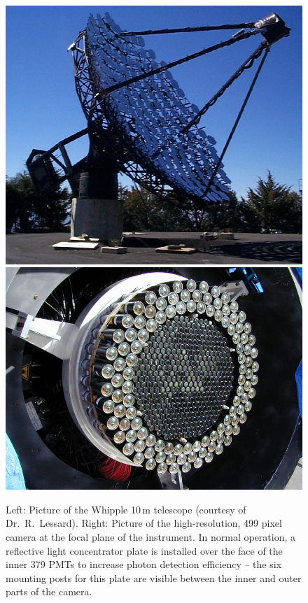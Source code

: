 \begin{figure}[p]
\hspace*{\fill}\includegraphics[height=0.25\textheight]{plots/chap-introduction/whipple99.jpg}\hspace*{\fill}\includegraphics[height=0.25\textheight]{plots/chap-introduction/G3Camera2_small.jpg}\hspace*{\fill}
\caption{\label{FIG::INTRODUCTION::PICS10M} Left: Picture of the
Whipple 10\,m telescope (courtesy of Dr.\ R.~Lessard). Right: Picture
of the high-resolution, 499 pixel camera at the focal plane of the
instrument. In normal operation, a reflective light concentrator
plate is installed over the face of the inner 379 PMTs to increase
photon detection efficiency -- the six mounting posts for this plate
are visible between the inner and outer parts of the camera.}
\end{figure}

